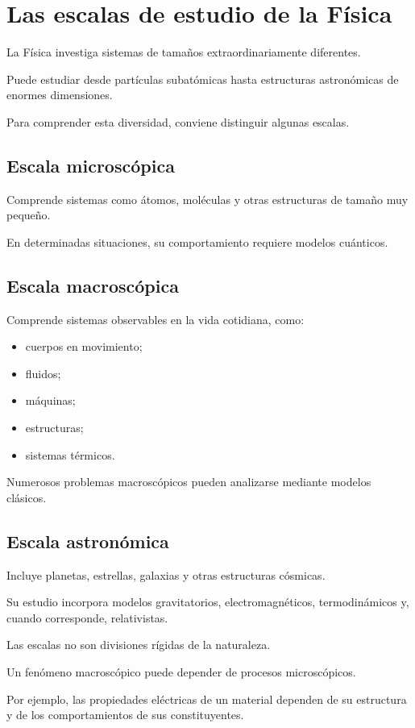 \section{Las escalas de estudio de la Física}

La Física investiga sistemas
de tamaños extraordinariamente diferentes.

Puede estudiar desde partículas
subatómicas hasta estructuras
astronómicas de enormes dimensiones.

Para comprender esta diversidad,
conviene distinguir algunas escalas.

\subsection{Escala microscópica}

Comprende sistemas como átomos,
moléculas y otras estructuras
de tamaño muy pequeño.

En determinadas situaciones,
su comportamiento requiere
modelos cuánticos.

\subsection{Escala macroscópica}

Comprende sistemas observables
en la vida cotidiana, como:

\begin{itemize}
    \item cuerpos en movimiento;
    \item fluidos;
    \item máquinas;
    \item estructuras;
    \item sistemas térmicos.
\end{itemize}

Numerosos problemas macroscópicos
pueden analizarse mediante modelos clásicos.

\subsection{Escala astronómica}

Incluye planetas, estrellas,
galaxias y otras estructuras cósmicas.

Su estudio incorpora modelos
gravitatorios, electromagnéticos,
termodinámicos y, cuando corresponde,
relativistas.

\begin{interpretacion}

Las escalas no son divisiones rígidas
de la naturaleza.

Un fenómeno macroscópico puede depender
de procesos microscópicos.

Por ejemplo, las propiedades eléctricas
de un material dependen de su estructura
y de los comportamientos de sus constituyentes.

\end{interpretacion}


